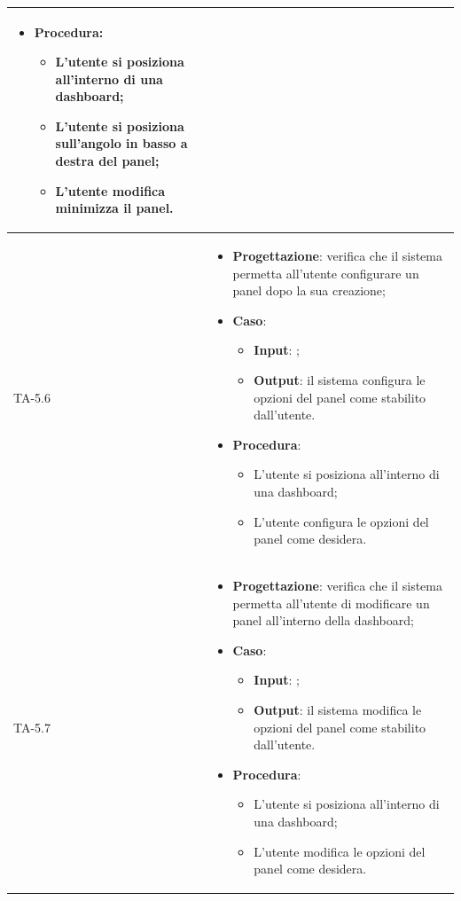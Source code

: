 \begin{longtable}{|C{2.5cm}|C{13cm}|}
\begin{itemize}
\begin{itemize}
	\end{itemize}
	\item \textbf{Procedura}:
	\begin{itemize}
		\item L'utente si posiziona all'interno di una dashboard;
		\item L'utente si posiziona sull'angolo in basso a destra del panel;
		\item L'utente modifica minimizza il panel.
	\end{itemize} 
\end{itemize} \\
\hline
{TA-5.6} &
\begin{itemize}
	\item \textbf{Progettazione}: verifica che il sistema permetta all'utente configurare un panel dopo la sua creazione;
	\item \textbf{Caso}: 
	\begin{itemize}
		\item \textbf{Input}: ;
		\item \textbf{Output}: il sistema configura le opzioni del panel come stabilito dall'utente.
	\end{itemize}
	\item \textbf{Procedura}:
	\begin{itemize}
		\item L'utente si posiziona all'interno di una dashboard;
		\item L'utente configura le opzioni del panel come desidera.
	\end{itemize} 
\end{itemize} \\
\hline
{TA-5.7} &
\begin{itemize}
	\item \textbf{Progettazione}: verifica che il sistema permetta all'utente di modificare un panel all'interno della dashboard;
	\item \textbf{Caso}: 
	\begin{itemize}
		\item \textbf{Input}: ;
		\item \textbf{Output}: il sistema modifica le opzioni del panel come stabilito dall'utente.
	\end{itemize}
	\item \textbf{Procedura}:
	\begin{itemize}
		\item L'utente si posiziona all'interno di una dashboard;
		\item L'utente modifica le opzioni del panel come desidera.

\end{itemize}
\end{itemize}
\end{longtable}
